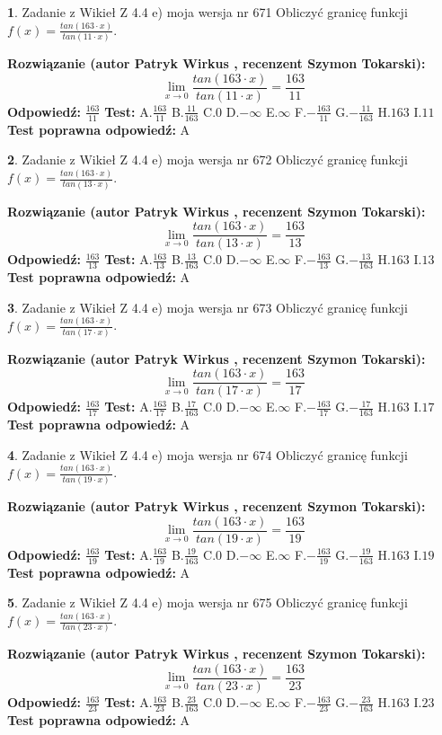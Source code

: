 \documentclass[12pt, a4paper]{article}
\theoremstyle{definition} %
\newtheorem{zad}{}
\newcommand{\zadStart}[1]{\begin{zad}#1\newline}
\newcommand{\zadStop}{\end{zad}}
\newcommand{\rozwStart}[2]{\noindent \textbf{Rozwiązanie (autor #1 , recenzent #2): }\newline}
\newcommand{\rozwStop}{\newline}
\newcommand{\odpStart}{\noindent \textbf{Odpowiedź:}\newline}
\newcommand{\odpStop}{\newline}
\newcommand{\testStart}{\noindent \textbf{Test:}\newline}
\newcommand{\testStop}{\newline}
\newcommand{\kluczStart}{\noindent \textbf{Test poprawna odpowiedź:}\newline}
\newcommand{\kluczStop}{\newline}
\begin{document}
\zadStart{Zadanie z Wikieł Z 4.4 e) moja wersja nr 671}
Obliczyć granicę funkcji $f(x)=\frac{tan(163\cdot x)}{tan(11\cdot x)}$.
\zadStop
\rozwStart{Patryk Wirkus}{Szymon Tokarski}
$$\lim\limits_{x\to 0}\frac{tan(163\cdot x)}{tan(11\cdot x)}=
\frac{163}{11}$$
\rozwStop
\odpStart
$\frac{163}{11}$
\odpStop
\testStart
A.$\frac{163}{11}$
B.$\frac{11}{163}$
C.$0$
D.$-\infty$
E.$\infty$
F.$-\frac{163}{11}$
G.$-\frac{11}{163}$
H.$163$
I.$11$
\testStop
\kluczStart
A
\kluczStop



\zadStart{Zadanie z Wikieł Z 4.4 e) moja wersja nr 672}
Obliczyć granicę funkcji $f(x)=\frac{tan(163\cdot x)}{tan(13\cdot x)}$.
\zadStop
\rozwStart{Patryk Wirkus}{Szymon Tokarski}
$$\lim\limits_{x\to 0}\frac{tan(163\cdot x)}{tan(13\cdot x)}=
\frac{163}{13}$$
\rozwStop
\odpStart
$\frac{163}{13}$
\odpStop
\testStart
A.$\frac{163}{13}$
B.$\frac{13}{163}$
C.$0$
D.$-\infty$
E.$\infty$
F.$-\frac{163}{13}$
G.$-\frac{13}{163}$
H.$163$
I.$13$
\testStop
\kluczStart
A
\kluczStop



\zadStart{Zadanie z Wikieł Z 4.4 e) moja wersja nr 673}
Obliczyć granicę funkcji $f(x)=\frac{tan(163\cdot x)}{tan(17\cdot x)}$.
\zadStop
\rozwStart{Patryk Wirkus}{Szymon Tokarski}
$$\lim\limits_{x\to 0}\frac{tan(163\cdot x)}{tan(17\cdot x)}=
\frac{163}{17}$$
\rozwStop
\odpStart
$\frac{163}{17}$
\odpStop
\testStart
A.$\frac{163}{17}$
B.$\frac{17}{163}$
C.$0$
D.$-\infty$
E.$\infty$
F.$-\frac{163}{17}$
G.$-\frac{17}{163}$
H.$163$
I.$17$
\testStop
\kluczStart
A
\kluczStop



\zadStart{Zadanie z Wikieł Z 4.4 e) moja wersja nr 674}
Obliczyć granicę funkcji $f(x)=\frac{tan(163\cdot x)}{tan(19\cdot x)}$.
\zadStop
\rozwStart{Patryk Wirkus}{Szymon Tokarski}
$$\lim\limits_{x\to 0}\frac{tan(163\cdot x)}{tan(19\cdot x)}=
\frac{163}{19}$$
\rozwStop
\odpStart
$\frac{163}{19}$
\odpStop
\testStart
A.$\frac{163}{19}$
B.$\frac{19}{163}$
C.$0$
D.$-\infty$
E.$\infty$
F.$-\frac{163}{19}$
G.$-\frac{19}{163}$
H.$163$
I.$19$
\testStop
\kluczStart
A
\kluczStop



\zadStart{Zadanie z Wikieł Z 4.4 e) moja wersja nr 675}
Obliczyć granicę funkcji $f(x)=\frac{tan(163\cdot x)}{tan(23\cdot x)}$.
\zadStop
\rozwStart{Patryk Wirkus}{Szymon Tokarski}
$$\lim\limits_{x\to 0}\frac{tan(163\cdot x)}{tan(23\cdot x)}=
\frac{163}{23}$$
\rozwStop
\odpStart
$\frac{163}{23}$
\odpStop
\testStart
A.$\frac{163}{23}$
B.$\frac{23}{163}$
C.$0$
D.$-\infty$
E.$\infty$
F.$-\frac{163}{23}$
G.$-\frac{23}{163}$
H.$163$
I.$23$
\testStop
\kluczStart
A
\kluczStop
\end{document}
